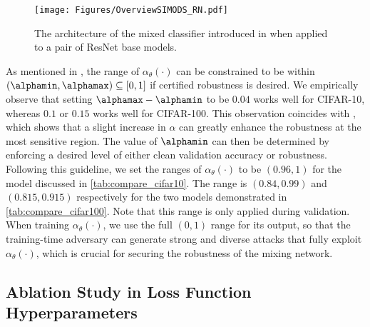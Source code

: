 \documentclass[11pt, letterpaper]{article}
\theoremstyle{plain}
\theoremstyle{definition}
\begin{document}
\begin{figure}[!tb]
    \centering
    \texttt{[image: Figures/OverviewSIMODS\_RN.pdf]}
    \caption{The architecture of the mixed classifier introduced in  when applied to a pair of ResNet base models.}
    \label{fig:mixing_arch_rn}
\end{figure}

As mentioned in , the range of $\alpha_\theta (\cdot)$ can be constrained to be within $(\alphamin, \alphamax) \subseteq [0, 1]$ if certified robustness is desired. We empirically observe that setting $\alphamax - \alphamin$ to be $0.04$ works well for CIFAR-10, whereas $0.1$ or $0.15$ works well for CIFAR-100. This observation coincides with , which shows that a slight increase in $\alpha$ can greatly enhance the robustness at the most sensitive region. The value of $\alphamin$ can then be determined by enforcing a desired level of either clean validation accuracy or robustness. Following this guideline, we set the ranges of $\alpha_\theta (\cdot)$ to be $(0.96, 1)$ for the model discussed in \cref{tab:compare_cifar10}. The range is $(0.84, 0.99)$ and $(0.815, 0.915)$ respectively for the two models demonstrated in \cref{tab:compare_cifar100}. Note that this range is only applied during validation. When training $\alpha_\theta (\cdot)$, we use the full $(0, 1)$ range for its output, so that the training-time adversary can generate strong and diverse attacks that fully exploit $\alpha_\theta (\cdot)$, which is crucial for securing the robustness of the mixing network. 


\subsection{Ablation Study in Loss Function Hyperparameters} \label{sec:loss_abla}
\end{document}
